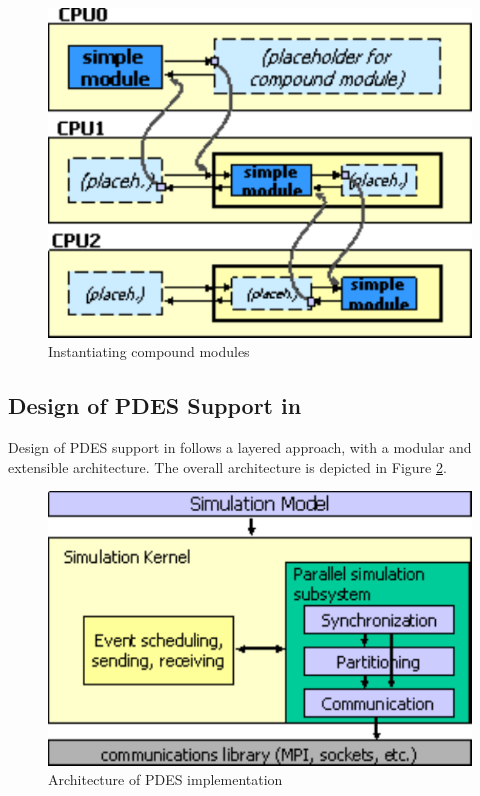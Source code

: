 \begin{figure}[htbp]
  \begin{center}
    \includegraphics{figures/placeholders2}
    \caption{Instantiating compound modules}
    \label{fig:inst}
  \end{center}
\end{figure}


\subsection{Design of PDES Support in {\opp}}

Design of PDES support in {\opp} follows a layered approach,
with a modular and extensible architecture. The overall
architecture is depicted in Figure \ref{fig:parsim-arch}.

\begin{figure}[htbp]
  \begin{center}
    \includegraphics{figures/parsim-arch}
    \caption{Architecture of {\opp} PDES implementation}
    \label{fig:parsim-arch}
  \end{center}
\end{figure}

